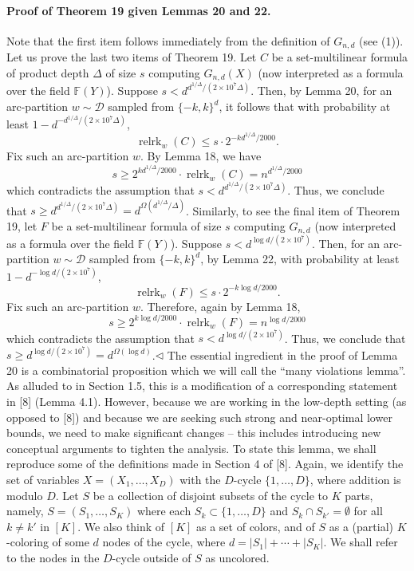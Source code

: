 \documentclass[10pt,a4paper]{article}
\begin{document}
\paragraph{Proof of Theorem 19 given Lemmas 20 and 22.} Note that the first item follows immediately from the definition of $G_{n,d}$ (see (1)). Let us prove the last two items of Theorem 19. Let $C$ be a set-multilinear formula of product depth $\Delta$ of size $s$ computing $G_{n,d}(X)$ (now interpreted as a formula over the field $\mathbb F(Y)$). Suppose $s<d^{d^{1/\Delta}/(2\times10^7\Delta)}$. Then, by Lemma 20, for an arc-partition $w\sim\mathcal D$ sampled from $\{-k,k\}^d$, it follows that with probability at least $1-d^{-d^{1/\Delta}/(2\times10^7\Delta)}$,
\[\operatorname{relrk}_w(C)\leq s\cdot2^{-kd^{1/\Delta}/2000}.\]
Fix such an arc-partition $w$. By Lemma 18, we have
\[s\geq2^{kd^{1/\Delta}/2000}\cdot\operatorname{relrk}_w(C)=n^{d^{1/\Delta}/2000}\]
which contradicts the assumption that $s<d^{d^{1/\Delta}/(2\times10^7\Delta)}$. Thus, we conclude that $s\geq d^{d^{1/\Delta}/(2\times10^7\Delta)}=d^{\Omega(d^{1/\Delta}/\Delta)}$.
Similarly, to see the final item of Theorem 19, let $F$ be a set-multilinear formula of size $s$ computing $G_{n,d}$ (now interpreted as a formula over the field $\mathbb F(Y)$). Suppose $s<d^{\log d/(2\times10^7)}$. Then, for an arc-partition $w\sim\mathcal D$ sampled from $\{-k,k\}^d$, by Lemma 22, with probability at least $1-d^{-\log d/(2\times10^7)}$,
\[\operatorname{relrk}_w(F)\leq s\cdot2^{-k\log d/2000}.\]
Fix such an arc-partition $w$. Therefore, again by Lemma 18,
\[s\geq2^{k\log d/2000}\cdot\operatorname{relrk}_w(F)=n^{\log d/2000}\]
which contradicts the assumption that $s<d^{\log d/(2\times10^7)}$. Thus, we conclude that $s\geq d^{\log d/(2\times10^7)}=d^{\Omega(\log d)}$.\hfill$\triangleleft$
The essential ingredient in the proof of Lemma 20 is a combinatorial proposition which we will call the ``many violations lemma''. As alluded to in Section 1.5, this is a modification of a corresponding statement in [8] (Lemma 4.1). However, because we are working in the low-depth setting (as opposed to [8]) and because we are seeking such strong and near-optimal lower bounds, we need to make significant changes -- this includes introducing new conceptual arguments to tighten the analysis. To state this lemma, we shall reproduce some of the definitions made in Section 4 of [8].
Again, we identify the set of variables $X=(X_1,\ldots,X_D)$ with the $D$-cycle $\{1,\ldots,D\}$, where addition is modulo $D$. Let $S$ be a collection of disjoint subsets of the cycle to $K$ parts, namely, $S=(S_1,\ldots,S_K)$ where each $S_k\subset\{1,\ldots,D\}$ and $S_k\cap S_{k'}=\emptyset$ for all $k\neq k'$ in $[K]$. We also think of $[K]$ as a set of colors, and of $S$ as a (partial) $K$-coloring of some $d$ nodes of the cycle, where $d=|S_1|+\cdots+|S_K|$. We shall refer to the nodes in the $D$-cycle outside of $S$ as uncolored.
\end{document}
